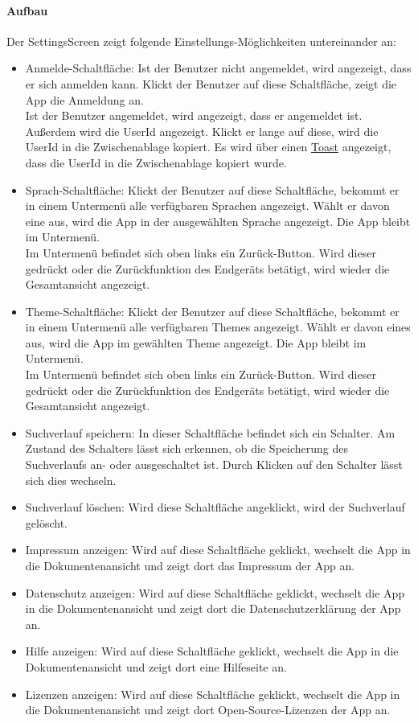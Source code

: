 \paragraph*{Aufbau}
Der SettingsScreen zeigt folgende Einstellungs-Möglichkeiten untereinander an:
\begin{itemize}
    \item Anmelde-Schaltfläche: Ist der Benutzer nicht angemeldet, wird angezeigt, dass er sich anmelden kann. 
    Klickt der Benutzer auf diese Schaltfläche, zeigt die App die Anmeldung an.\\
    Ist der Benutzer angemeldet, wird angezeigt, dass er angemeldet ist. Außerdem wird die UserId angezeigt. 
    Klickt er lange auf diese, wird die UserId in die Zwischenablage kopiert. 
    Es wird über einen \href{https://developer.android.com/guide/topics/ui/notifiers/toasts}{Toast} angezeigt, dass 
    die UserId in die Zwischenablage kopiert wurde.
    \item Sprach-Schaltfläche: Klickt der Benutzer auf diese Schaltfläche, bekommt er in einem Untermenü alle verfügbaren Sprachen angezeigt. 
    Wählt er davon eine aus, wird die App in der ausgewählten Sprache angezeigt. Die App bleibt im Untermenü.\\
    Im Untermenü befindet sich oben links ein Zurück-Button. Wird dieser gedrückt oder die Zurückfunktion des Endgeräts betätigt, 
    wird wieder die Gesamtansicht angezeigt.
    \item Theme-Schaltfläche: Klickt der Benutzer auf diese Schaltfläche, bekommt er in einem Untermenü alle verfügbaren Themes angezeigt. 
    Wählt er davon eines aus, wird die App im gewählten Theme angezeigt. Die App bleibt im Untermenü.\\
    Im Untermenü befindet sich oben links ein Zurück-Button. Wird dieser gedrückt oder die Zurückfunktion des Endgeräts betätigt, 
    wird wieder die Gesamtansicht angezeigt.
    \item Suchverlauf speichern: In dieser Schaltfläche befindet sich ein Schalter. 
    Am Zustand des Schalters lässt sich erkennen, ob die Speicherung des Suchverlaufs an- oder ausgeschaltet ist. 
    Durch Klicken auf den Schalter lässt sich dies wechseln.
    \item Suchverlauf löschen: Wird diese Schaltfläche angeklickt, wird der Suchverlauf gelöscht.
    \item Impressum anzeigen: Wird auf diese Schaltfläche geklickt, wechselt die App in die Dokumentenansicht und zeigt dort das Impressum der App an.
    \item Datenschutz anzeigen: Wird auf diese Schaltfläche geklickt, wechselt die App in die Dokumentenansicht und zeigt dort die Datenschutzerklärung der App an.
    \item Hilfe anzeigen: Wird auf diese Schaltfläche geklickt, wechselt die App in die Dokumentenansicht und zeigt dort eine Hilfeseite an.
    \item Lizenzen anzeigen: Wird auf diese Schaltfläche geklickt, wechselt die App in die Dokumentenansicht und zeigt dort Open-Source-Lizenzen der App an.
\end{itemize}